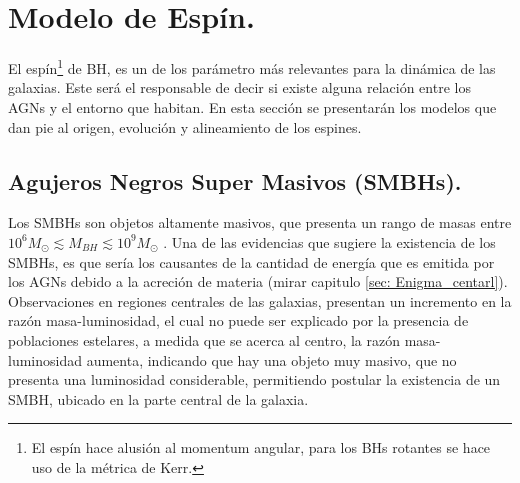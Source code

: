 \begin{savequote}[50mm]
\end{savequote}




\chapter{Modelo de Espín.}
\label{cha:Modelo de Spin}

El espín\footnote{El espín hace alusión al momentum angular, para los BHs rotantes se hace uso de la métrica de Kerr.} de BH, es un de los parámetro más relevantes para la dinámica de las galaxias. Este será el responsable de decir si existe alguna relación entre los AGNs y el entorno que habitan. En esta sección se presentarán los modelos que dan pie al origen, evolución y  alineamiento de los espines.

\section{Agujeros Negros Super Masivos (SMBHs).}
\label{sec: SMBH}
Los SMBHs son objetos altamente masivos, que presenta un rango de masas entre $10^6M_{\odot}\lesssim M_{BH} \lesssim 10^{9}M_{\odot}$ \cite{mo2010}. Una de las evidencias que sugiere la existencia de los SMBHs, es que sería los causantes de la cantidad de energía que es emitida por los AGNs debido a la acreción de materia (mirar capitulo \ref{sec: Enigma_centarl}). Observaciones en regiones centrales de las galaxias, presentan un incremento en la razón masa-luminosidad, el cual no puede ser explicado por la presencia de poblaciones estelares, a medida que se acerca al centro, la razón masa-luminosidad aumenta, indicando que hay una objeto muy masivo, que no presenta una luminosidad considerable, permitiendo postular la existencia de un SMBH, ubicado en la parte central de la galaxia.  

